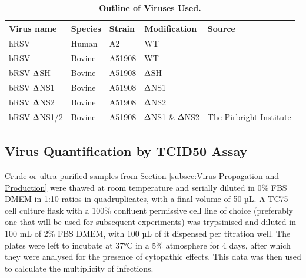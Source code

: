 \begin{table}
\centering
\begin{tabular}{lllll}
\toprule
{\textbf{Virus name}} &
  {\textbf{Species}} &
  { \textbf{Strain}} &
  { \textbf{Modification}} &
  { \textbf{Source}} \\ \midrule
hRSV      & Human  & A2     & WT   &  \\ 
bRSV      & Bovine & A51908 & WT   &  \\ 
bRSV $\Updelta$SH  & Bovine & A51908 & $\Updelta$SH  &  \\ 
bRSV $\Updelta$NS1 & Bovine & A51908 & $\Updelta$NS1 &  \\ 
bRSV $\Updelta$NS2 & Bovine & A51908 & $\Updelta$NS2 &  \\ 
bRSV $\Updelta$NS1/2 &
  Bovine &
  A51908 &
  $\Updelta$NS1 \& $\Updelta$NS2 &
  \multirow{-8}{*}{The Pirbright Institute} \\ \bottomrule
\end{tabular}
\caption[Outline of Viruses Used.]{\textbf{Outline of Viruses Used.}}
\label{tab:Outline of Viruses Used table}
\end{table}

\subsection{Virus Quantification by TCID50 Assay} \label{subsec:Virus Quantification by TCID50 Assay}
Crude or ultra-purified samples from Section \ref{subsec:Virus Propagation and Production} were thawed at room temperature and serially diluted in 0\% FBS DMEM in 1:10 ratios in quadruplicates, with a final volume of 50 µL. A TC75 cell culture flask with a 100\% confluent permissive cell line of choice (preferably one that will be used for subsequent experiments) was trypsinised and diluted in 100 mL of 2\% FBS DMEM, with 100 µL of it dispensed per titration well. The plates were left to incubate at 37°C in a 5\%  atmosphere for 4 days, after which they were analysed for the presence of cytopathic effects. This data was then used to calculate the multiplicity of infections.

